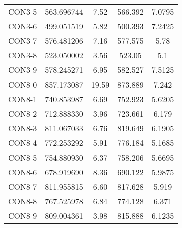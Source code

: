 \begin{table}[ht]
\begin{tabular}{c c c c c}
CON3-5 & 563.696744 & 7.52 & 566.392 & 7.0795 \\
CON3-6 & 499.051519 & 5.82 & 500.393 & 7.2425 \\
CON3-7 & 576.481206 & 7.16 & 577.575 & 5.78 \\
CON3-8 & 523.050002 & 3.56 & 523.05 & 5.1 \\
CON3-9 & 578.245271 & 6.95 & 582.527 & 7.5125 \\
CON8-0 & 857.173087 & 19.59 & 873.889 & 7.242 \\
CON8-1 & 740.853987 & 6.69 & 752.923 & 5.6205 \\
CON8-2 & 712.888330 & 3.96 & 723.661 & 6.179 \\
CON8-3 & 811.067033 & 6.76 & 819.649 & 6.1905 \\
CON8-4 & 772.253292 & 5.91 & 776.184 & 5.1685 \\
CON8-5 & 754.880930 & 6.37 & 758.206 & 5.6695 \\
CON8-6 & 678.919690 & 8.36 & 690.122 & 5.9875 \\
CON8-7 & 811.955815 & 6.60 & 817.628 & 5.919 \\
CON8-8 & 767.525978 & 6.84 & 774.128 & 6.371 \\
CON8-9 & 809.004361 & 3.98 & 815.888 & 6.1235 \\
[1ex]\hline
\end{tabular}
\label{table:nonlin}
\end{table} \clearpage
